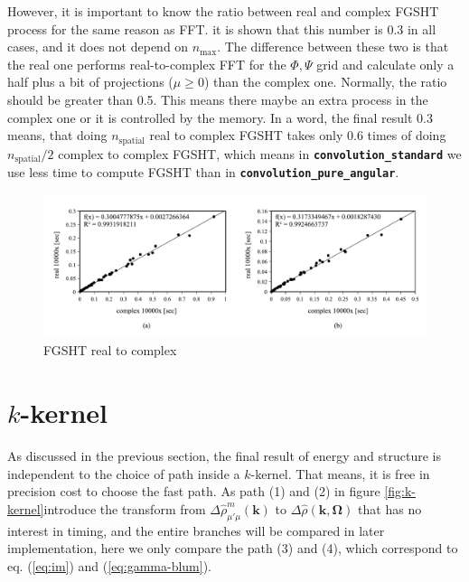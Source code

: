 However, it is important to know the ratio between real and complex
FGSHT process for the same reason as FFT. it is shown that this number
is 0.3 in all cases, and it does not depend on $n_{\max}$. The difference
between these two is that the real one performs real-to-complex FFT
for the $\Phi,\Psi$ grid and calculate only a half plus a bit of
projections ($\mu\geq0$) than the complex one. Normally, the ratio
should be greater than 0.5. This means there maybe an extra process
in the complex one or it is controlled by the memory. In a word, the
final result 0.3 means, that doing $n_{\mathrm{spatial}}$ real to
complex FGSHT takes only 0.6 times of doing $n_{\mathrm{spatial}}/2$
complex to complex FGSHT, which means in \texttt{\textbf{convolution\_standard}}
we use less time to compute FGSHT than in \texttt{\textbf{convolution\_pure\_angular}}.
\begin{center}
\begin{figure}[H]
\begin{centering}
\includegraphics[bb=0bp 20bp 680bp 235bp,width=1\columnwidth]{_figure/results/fgsht_real_v_cmplx}
\par\end{centering}
\caption{FGSHT real to complex\label{fig:fgsht-real-to-complex}}
\end{figure}
\par\end{center}

\section{$k$-kernel}

As discussed in the previous section, the final result of energy and
structure is independent to the choice of path inside a $k$-kernel.
That means, it is free in precision cost to choose the fast path.
As path (1) and (2) in figure \ref{fig:k-kernel}introduce the transform
from $\Delta\hat{\rho}_{\mu'\mu}^{m}(\mathbf{k})$ to $\Delta\hat{\rho}(\mathbf{k},\mathbf{\Omega})$
that has no interest in timing, and the entire branches will be compared
in later implementation, here we only compare the path (3) and (4),
which correspond to eq. (\ref{eq:im}) and (\ref{eq:gamma-blum}).

